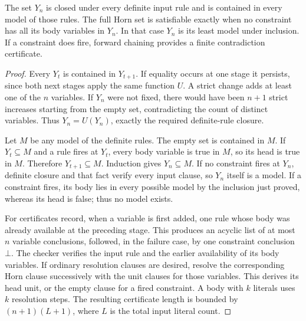 \begin{theorem}
\label{ca-horn}
The set $Y_n$ is closed under every definite input rule and is contained in
every model of those rules.  The full Horn set is satisfiable exactly when
no constraint has all its body variables in $Y_n$.  In that case $Y_n$ is
its least model under inclusion.  If a constraint does fire, forward chaining
provides a finite contradiction certificate.
\end{theorem}
\begin{proof}
Every $Y_t$ is contained in $Y_{t+1}$.  If equality occurs at one stage it
persists, since both next stages apply the same function $U$.  A strict
change adds at least one of the $n$ variables.  If $Y_n$ were not fixed,
there would have been $n+1$ strict increases starting from the empty set,
contradicting the count of distinct variables.  Thus $Y_n=U(Y_n)$, exactly
the required definite-rule closure.

Let $M$ be any model of the definite rules.  The empty set is contained in
$M$.  If $Y_t\subseteq M$ and a rule fires at $Y_t$, every body variable
is true in $M$, so its head is true in $M$.  Therefore
$Y_{t+1}\subseteq M$.  Induction gives $Y_n\subseteq M$.  If no constraint
fires at $Y_n$, definite closure and that fact verify every input clause,
so $Y_n$ itself is a model.  If a constraint fires, its body lies in every
possible model by the inclusion just proved, whereas its head is false;
thus no model exists.

For certificates record, when a variable is first added, one rule whose
body was already available at the preceding stage.  This produces an
acyclic list of at most $n$ variable conclusions, followed, in the failure
case, by one constraint conclusion $\bot$.  The checker verifies the input
rule and the earlier availability of its body variables.  If ordinary
resolution clauses are desired, resolve the corresponding Horn clause
successively with the unit clauses for those variables.  This derives its
head unit, or the empty clause for a fired constraint.  A body with $k$
literals uses $k$ resolution steps.  The resulting certificate length is
bounded by $(n+1)(L+1)$, where $L$ is the total input literal count.
\end{proof}

